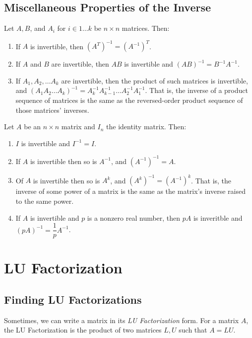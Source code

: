 \documentclass[11pt]{exam}
\begin{document}
    \vspace{20px}
    \subsection{Miscellaneous Properties of the Inverse}
    Let $A, B$, and $A_i$ for $i \in 1 \dots k$ be $n \times n$ matrices. Then:
    \begin{enumerate}
        \item If $A$ is invertible, then $(A^T)^{-1} = (A^{-1})^T$.
        \item If $A$ and $B$ are invertible, then $AB$ is invertible and $(AB)^{-1} = B^{-1}A^{-1}$.
        \item If $A_1, A_2, \dots A_k$ are invertible, then the product of such matrices is invertible, and
        $(A_1 A_2 \dots A_k)^{-1} = A_k^{-1} A_{k-1}^{-1} \dots A_2^{-1} A_1^{-1}$. That is, the inverse of a product sequence of matrices
        is the same as the reversed-order product sequence of those matrices' inverses. 
    \end{enumerate}

    Let $A$ be an $n \times n$ matrix and $I_n$ the identity matrix. Then:
    \begin{enumerate}
        \item $I$ is invertible and $I^{-1} = I$.
        \item If $A$ is invertible then so is $A^{-1}$, and $(A^{-1})^{-1} = A$.
        \item Of $A$ is invertible then so is $A^k$, and $(A^k)^{-1} = (A^{-1})^k$. That is, the inverse of some power of a matrix is
        the same as the matrix's inverse raised to the same power.
        \item If $A$ is invertible and $p$ is a nonzero real number, then $pA$ is inveritble and $(pA)^{-1} = \dfrac{1}{p}A^{-1}$.
    \end{enumerate}

\pagebreak
\section{LU Factorization}
    \subsection{Finding LU Factorizations}
    Sometimes, we can write a matrix in its \textit{LU Factorization} form.
    For a matrix $A$, the LU Factorization is the product of two matrices $L,U$ such that $A = LU$.
\end{document}
